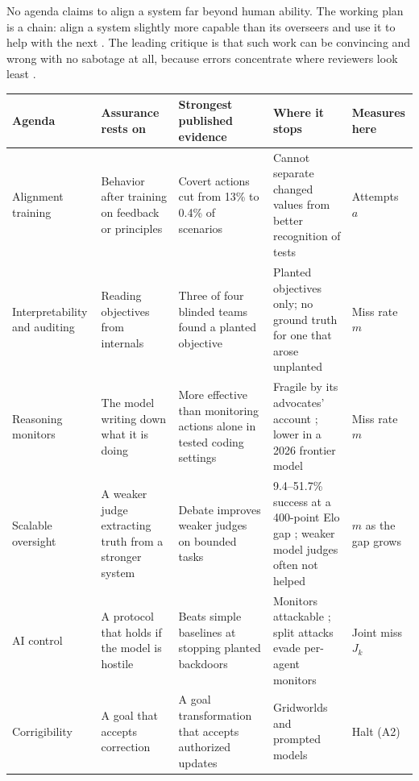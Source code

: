 \documentclass[10pt,twocolumn,letterpaper]{article}
\theoremstyle{definition}
\begin{document}
No agenda claims to align a system far beyond human ability. The working plan is a chain: align a system slightly more capable than its overseers and use it to help with the next \cite{bowkis}. The leading critique is that such work can be convincing and wrong with no sabotage at all, because errors concentrate where reviewers look least \cite{bowkis}.

\begin{table}[t]
\centering
\footnotesize
\setlength{\tabcolsep}{4.5pt}
\renewcommand{\arraystretch}{1.16}
\begin{tabularx}{\textwidth}{@{}P{0.98in}P{1.18in}LLP{0.82in}@{}}
\toprule
\textbf{Agenda} & \textbf{Assurance rests on} & \textbf{Strongest published evidence} & \textbf{Where it stops} & \textbf{Measures here}\\
\midrule
Alignment training \cite{bai,casper,schoen} & Behavior after training on feedback or principles & Covert actions cut from 13\% to 0.4\% of scenarios \cite{schoen} & Cannot separate changed values from better recognition of tests & Attempts $a$\\
Interpretability and auditing \cite{marks} & Reading objectives from internals & Three of four blinded teams found a planted objective \cite{marks} & Planted objectives only; no ground truth for one that arose unplanted & Miss rate $m$\\
Reasoning monitors \cite{korbak,baker} & The model writing down what it is doing & More effective than monitoring actions alone in tested coding settings \cite{baker} & Fragile by its advocates' account \cite{korbak}; lower in a 2026 frontier model \cite{astra} & Miss rate $m$\\
Scalable oversight \cite{irving,khan,burns} & A weaker judge extracting truth from a stronger system & Debate improves weaker judges on bounded tasks \cite{khan} & 9.4--51.7\% success at a 400-point Elo gap \cite{engels}; weaker model judges often not helped \cite{carro} & $m$ as the gap grows\\
AI control \cite{control} & A protocol that holds if the model is hostile & Beats simple baselines at stopping planted backdoors \cite{control} & Monitors attackable \cite{terekhov}; split attacks evade per-agent monitors \cite{makins} & Joint miss $J_{k}$\\
Corrigibility \cite{soares,hadfield2017,hudson} & A goal that accepts correction & A goal transformation that accepts authorized updates \cite{hudson} & Gridworlds and prompted models & Halt (A2)\\

\end{tabularx}
\end{table}
\end{document}
